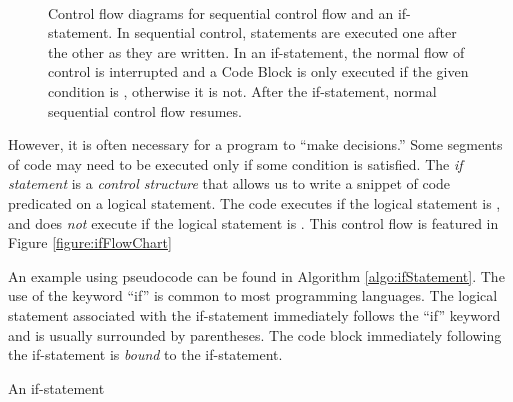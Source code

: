 \begin{figure}
\centering
{}
~~~~~~
\caption[Control flow diagrams for sequential control flow and an if-statement.]{Control 
flow diagrams for sequential control flow and an if-statement.  In
sequential control, statements are executed one after the other as they are written.
In an if-statement, the normal flow of control is interrupted and a Code Block is
only executed if the given condition is \True, otherwise it is not.  After the 
if-statement, normal sequential control flow resumes.}
\label{figures:sequentialAndIfStatement}
\end{figure}

%

However, it is often necessary for a program to ``make decisions.''  Some segments
of code may need to be executed only if some condition is satisfied.  The 
\emph{if statement} is a \emph{control structure} that allows us to write 
a snippet of code predicated on a logical statement.  The code executes if
the logical statement is \True, and does \emph{not} execute if the logical
statement is \False.  This control flow is featured in Figure \ref{figure:ifFlowChart}

%

An example using pseudocode can be found in Algorithm \ref{algo:ifStatement}.
The use of the keyword ``if'' is common to most programming languages.  The 
logical statement associated with the if-statement immediately follows the 
``if'' keyword and is usually surrounded by parentheses.  The code block 
immediately following the if-statement is \emph{bound} to the if-statement. 

\begin{algorithm}[H]
\caption{An if-statement}
\label{algo:ifStatement}
\end{algorithm}

